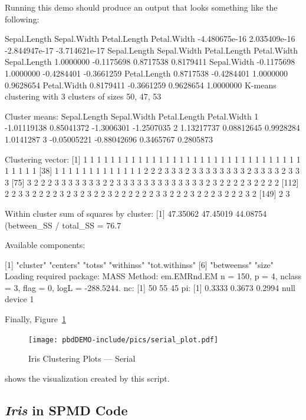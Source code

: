 Running this demo should produce an output that looks something like the
following:
\begin{Output}
 Sepal.Length   Sepal.Width  Petal.Length   Petal.Width 
-4.480675e-16  2.035409e-16 -2.844947e-17 -3.714621e-17 
             Sepal.Length Sepal.Width Petal.Length Petal.Width
Sepal.Length    1.0000000  -0.1175698    0.8717538   0.8179411
Sepal.Width    -0.1175698   1.0000000   -0.4284401  -0.3661259
Petal.Length    0.8717538  -0.4284401    1.0000000   0.9628654
Petal.Width     0.8179411  -0.3661259    0.9628654   1.0000000
K-means clustering with 3 clusters of sizes 50, 47, 53

Cluster means:
  Sepal.Length Sepal.Width Petal.Length Petal.Width
1  -1.01119138  0.85041372   -1.3006301  -1.2507035
2   1.13217737  0.08812645    0.9928284   1.0141287
3  -0.05005221 -0.88042696    0.3465767   0.2805873

Clustering vector:
  [1] 1 1 1 1 1 1 1 1 1 1 1 1 1 1 1 1 1 1 1 1 1 1 1 1 1 1 1 1 1 1 1 1 1 1 1 1 1
 [38] 1 1 1 1 1 1 1 1 1 1 1 1 1 2 2 2 3 3 3 2 3 3 3 3 3 3 3 3 2 3 3 3 3 2 3 3 3
 [75] 3 2 2 2 3 3 3 3 3 3 3 2 2 3 3 3 3 3 3 3 3 3 3 3 3 3 2 3 2 2 2 2 3 2 2 2 2
[112] 2 2 3 3 2 2 2 2 3 2 3 2 3 2 2 3 2 2 2 2 2 2 3 3 2 2 2 3 2 2 2 3 2 2 2 3 2
[149] 2 3

Within cluster sum of squares by cluster:
[1] 47.35062 47.45019 44.08754
 (between_SS / total_SS =  76.7 %

Available components:

[1] "cluster"      "centers"      "totss"        "withinss"     "tot.withinss"
[6] "betweenss"    "size"        
Loading required package: MASS
Method: em.EMRnd.EM
 n = 150, p = 4, nclass = 3, flag = 0, logL = -288.5244.
nc: 
[1] 50 55 45
pi: 
[1] 0.3333 0.3673 0.2994
null device 
          1 
\end{Output}

Finally, Figure~\ref{fig:iris_cluster_serial}
\begin{figure}[h!bt]
  \centering
  \texttt{[image: pbdDEMO-include/pics/serial\_plot.pdf]}
  \caption{Iris Clustering Plots --- Serial}
  \label{fig:iris_cluster_serial}
\end{figure}
shows the visualization created by this script.








\subsection{{\it Iris} in SPMD Code}


